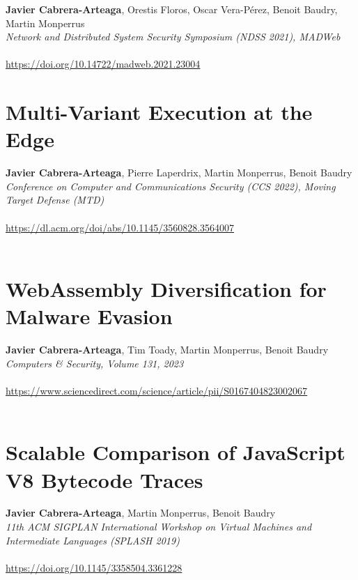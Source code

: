 \textbf{Javier Cabrera-Arteaga}, Orestis Floros, Oscar Vera-Pérez, Benoit Baudry, Martin Monperrus\\
\emph{Network and Distributed System Security Symposium (NDSS 2021), MADWeb}\\\\
\url{https://doi.org/10.14722/madweb.2021.23004}\\

%
    {} %
    {} %
    
\chapter{Multi-Variant Execution at the Edge}

\textbf{Javier Cabrera-Arteaga}, Pierre Laperdrix, Martin Monperrus, Benoit Baudry\\
\emph{Conference on Computer and Communications Security (CCS 2022), Moving Target Defense (MTD)}\\\\
 \url{https://dl.acm.org/doi/abs/10.1145/3560828.3564007}\\\\

%
    {} %
    {} %
    
\chapter{WebAssembly Diversification for Malware Evasion}

\textbf{Javier Cabrera-Arteaga}, Tim Toady, Martin Monperrus, Benoit Baudry\\
\emph{Computers \& Security, Volume 131, 2023}\\\\
\url{https://www.sciencedirect.com/science/article/pii/S0167404823002067}\\\\

%
    {} %
    {} %
    
\chapter{Scalable Comparison of JavaScript V8 Bytecode Traces}

\textbf{Javier Cabrera-Arteaga}, Martin Monperrus, Benoit Baudry\\
\emph{11th ACM SIGPLAN International Workshop on Virtual Machines and Intermediate Languages (SPLASH 2019)}\\\\
\url{https://doi.org/10.1145/3358504.3361228}\\


%
    {} %
    {} %
    